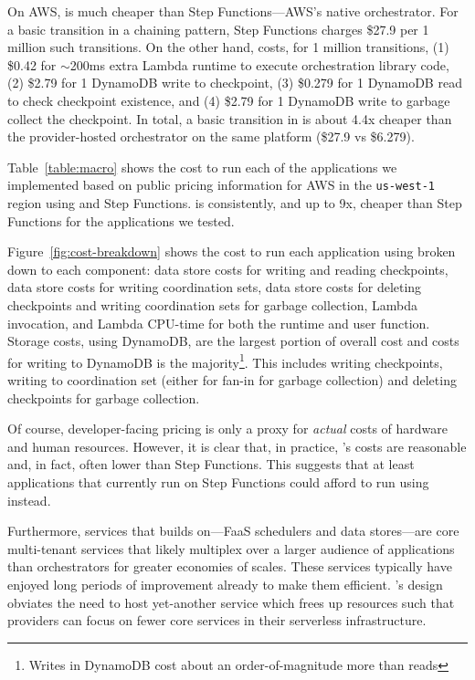On AWS, \name{} is much cheaper than Step Functions---AWS's native
orchestrator. For a basic transition in a chaining pattern, Step Functions
charges \$27.9 per 1 million such transitions. On the other hand,
\name{} costs, for 1 million transitions, (1) \$0.42 for $\sim$200ms extra
Lambda runtime to execute orchestration library code, (2) \$2.79 for 1
DynamoDB write to checkpoint, (3) \$0.279 for 1 DynamoDB read to check
checkpoint existence, and (4) \$2.79 for 1 DynamoDB write to garbage collect
the checkpoint. In total, a basic transition in \name{} is about 4.4x cheaper
than the provider-hosted orchestrator on the same platform (\$27.9 vs
\$6.279).

Table~\ref{table:macro} shows the cost to run each of the applications we
implemented based on public pricing information for AWS in the
\texttt{us-west-1} region using \name{} and Step Functions. \name{} is
consistently, and up to 9x, cheaper than Step Functions for the applications
we tested.

Figure~\ref{fig:cost-breakdown} shows the cost to run each application using
\name{} broken down to each component: data store costs for writing and
reading checkpoints, data store costs for writing coordination sets, data
store costs for deleting checkpoints and writing coordination sets for garbage
collection, Lambda invocation, and Lambda CPU-time for both the \name{}
runtime and user function. Storage costs, using DynamoDB, are the largest
portion of overall cost and costs for writing to DynamoDB is the
majority\footnote{Writes in DynamoDB cost about an order-of-magnitude more
than reads}. This includes writing checkpoints, writing to coordination set
(either for fan-in for garbage collection) and deleting checkpoints for
garbage collection.

Of course, developer-facing pricing is only a proxy for \emph{actual} costs of
hardware and human resources. However, it is clear that, in practice,
\name{}'s costs are reasonable and, in fact, often lower than Step Functions.
This suggests that at least applications that currently run on Step Functions
could afford to run using \name{} instead.

Furthermore, services that \name{} builds on---FaaS schedulers and data
stores---are core multi-tenant services that likely multiplex over a larger
audience of applications than orchestrators for greater economies of scales.
These services typically have enjoyed long periods of improvement already to
make them efficient. \name{}'s design obviates the need to host yet-another
service which frees up resources such that providers can focus on fewer core
services in their serverless infrastructure.

